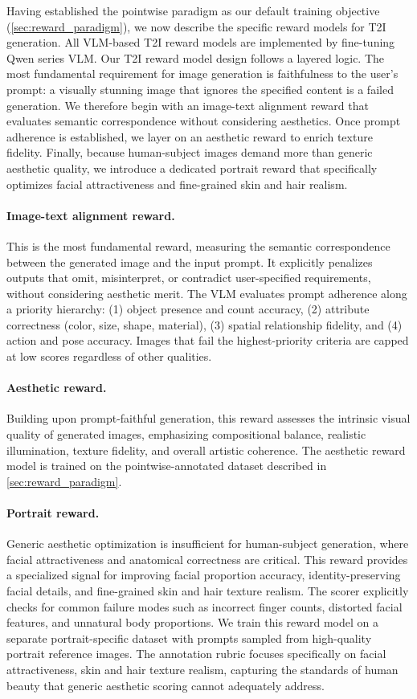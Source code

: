 \documentclass{article} %
\begin{document}
Having established the pointwise paradigm as our default training objective (\cref{sec:reward_paradigm}), we now describe the specific reward models for T2I generation. All VLM-based T2I reward models are implemented by fine-tuning Qwen series VLM. Our T2I reward model design follows a layered logic. The most fundamental requirement for image generation is faithfulness to the user's prompt: a visually stunning image that ignores the specified content is a failed generation. We therefore begin with an image-text alignment reward that evaluates semantic correspondence without considering aesthetics. Once prompt adherence is established, we layer on an aesthetic reward to enrich texture fidelity. Finally, because human-subject images demand more than generic aesthetic quality, we introduce a dedicated portrait reward that specifically optimizes facial attractiveness and fine-grained skin and hair realism.

\paragraph{Image-text alignment reward.} This is the most fundamental reward, measuring the semantic correspondence between the generated image and the input prompt. It explicitly penalizes outputs that omit, misinterpret, or contradict user-specified requirements, without considering aesthetic merit. The VLM evaluates prompt adherence along a priority hierarchy: (1) object presence and count accuracy, (2) attribute correctness (color, size, shape, material), (3) spatial relationship fidelity, and (4) action and pose accuracy. Images that fail the highest-priority criteria are capped at low scores regardless of other qualities.

\paragraph{Aesthetic reward.} Building upon prompt-faithful generation, this reward assesses the intrinsic visual quality of generated images, emphasizing compositional balance, realistic illumination, texture fidelity, and overall artistic coherence. The aesthetic reward model is trained on the pointwise-annotated dataset described in \cref{sec:reward_paradigm}.

\paragraph{Portrait reward.} Generic aesthetic optimization is insufficient for human-subject generation, where facial attractiveness and anatomical correctness are critical. This reward provides a specialized signal for improving facial proportion accuracy, identity-preserving facial details, and fine-grained skin and hair texture realism. The scorer explicitly checks for common failure modes such as incorrect finger counts, distorted facial features, and unnatural body proportions. We train this reward model on a separate portrait-specific dataset with prompts sampled from high-quality portrait reference images. The annotation rubric focuses specifically on facial attractiveness, skin and hair texture realism, capturing the standards of human beauty that generic aesthetic scoring cannot adequately address.
\end{document}
